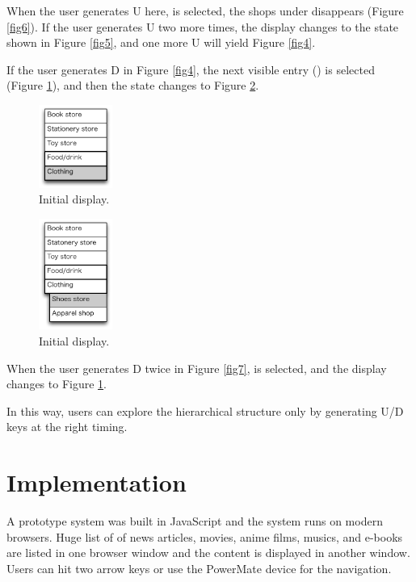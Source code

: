 \documentclass{article}
\begin{document}
When the user generates U here,  is selected,
the shops under  disappears (Figure \ref{fig6}).
If the user generates U two more times, the display changes to the state
shown in Figure \ref{fig5},
and one more U will yield Figure \ref{fig4}.

If the user generates D in Figure \ref{fig4}, the next visible entry
() is selected (Figure \ref{fig8}), and then the state changes to Figure \ref{fig9}.

\begin{figure}[H]
\centerline{\includegraphics[width=24mm,bb=0 0 139 157]{figures/fig8.pdf}}
\caption{Initial display.}
\label{fig8}
\end{figure}

\begin{figure}[H]
\centerline{\includegraphics[width=24mm,bb=0 0 139 211]{figures/fig9.pdf}}
\caption{Initial display.}
\label{fig9}
\end{figure}

When the user generates D twice in Figure \ref{fig7},
 is selected, and the display changes to Figure \ref{fig8}.

In this way, users can explore the hierarchical structure
only by generating U/D keys at the right timing.

\section*{Implementation}

A prototype system was built in JavaScript and the system runs on modern browsers.
Huge list of of news articles, movies, anime films, musics, and e-books are listed in one browser window
and the content is displayed in another window.
Users can hit two arrow keys or use the PowerMate device for the navigation.
\end{document}
